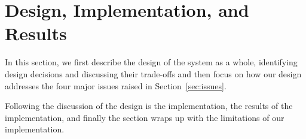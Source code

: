 \section{Design, Implementation, and Results}
\label{sec:des-impl}

In this section, we first describe the design of the system as a whole,
identifying design decisions and discussing their trade-offs and then
focus on how our design addresses the four major issues raised in
Section~\ref{sec:issues}. 

Following the discussion of the design is the implementation, the
results of the implementation, and finally the section wraps up with
the limitations of our implementation.





